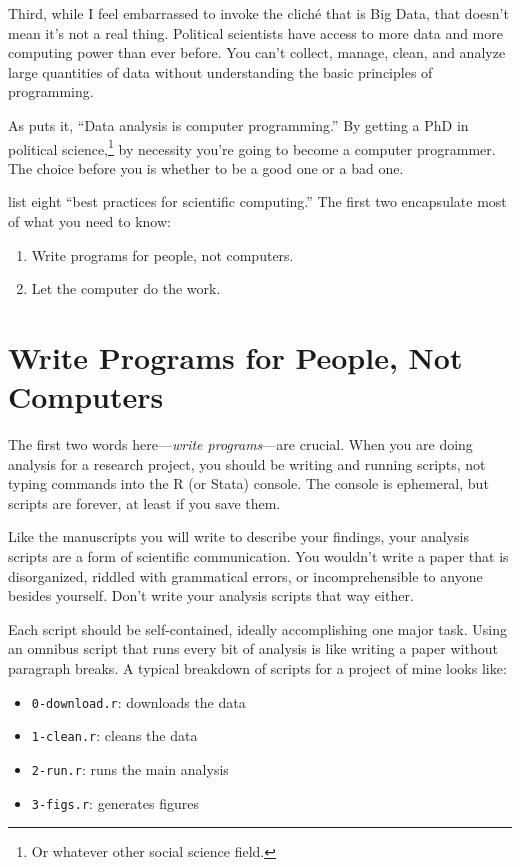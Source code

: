 \documentclass[12pt,oneside,openany]{book}
\providecommand{\tightlist}{%
  \setlength{\itemsep}{0pt}\setlength{\parskip}{0pt}}
\let\rmarkdownfootnote\footnote%
\def\footnote{\protect\rmarkdownfootnote}
\begin{document}
Third, while I feel embarrassed to invoke the cliché that is Big Data,
that doesn't mean it's not a real thing. Political scientists have
access to more data and more computing power than ever before. You can't
collect, manage, clean, and analyze large quantities of data without
understanding the basic principles of programming.

As \citet{Bowers:2011ua} puts it, ``Data analysis is computer
programming.'' By getting a PhD in political science,\footnote{Or
  whatever other social science field.} by necessity you're going to
become a computer programmer. The choice before you is whether to be a
good one or a bad one.

\citet{Wilson:2014ck} list eight ``best practices for scientific
computing.'' The first two encapsulate most of what you need to know:

\begin{enumerate}
\def\labelenumi{\arabic{enumi}.}
\tightlist
\item
  Write programs for people, not computers.
\item
  Let the computer do the work.
\end{enumerate}

\section{Write Programs for People, Not
Computers}\label{write-programs-for-people-not-computers}

The first two words here---\emph{write programs}---are crucial. When you
are doing analysis for a research project, you should be writing and
running scripts, not typing commands into the R (or Stata) console. The
console is ephemeral, but scripts are forever, at least if you save
them.

Like the manuscripts you will write to describe your findings, your
analysis scripts are a form of scientific communication. You wouldn't
write a paper that is disorganized, riddled with grammatical errors, or
incomprehensible to anyone besides yourself. Don't write your analysis
scripts that way either.

Each script should be self-contained, ideally accomplishing one major
task. Using an omnibus script that runs every bit of analysis is like
writing a paper without paragraph breaks. A typical breakdown of scripts
for a project of mine looks like:

\begin{itemize}
\tightlist
\item
  \texttt{0-download.r}: downloads the data
\item
  \texttt{1-clean.r}: cleans the data
\item
  \texttt{2-run.r}: runs the main analysis
\item
  \texttt{3-figs.r}: generates figures
\end{itemize}
\end{document}
